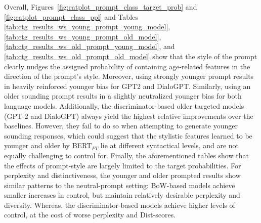 Overall, Figures~\ref{fig:catplot_prompt_class_target_prob} and \ref{fig:catplot_prompt_class_ppl} and Tables \ref{tab:ctg_results_ws_young_prompt_young_model}, \ref{tab:ctg_results_ws_young_prompt_old_model}, \ref{tab:ctg_results_ws_old_prompt_young_model}, and \ref{tab:ctg_results_ws_old_prompt_old_model} show that the style of the prompt clearly nudges the assigned probability of containing age-related features in the direction of the prompt's style. Moreover, using strongly younger prompt results in heavily reinforced younger bias for GPT2 and DialoGPT. Similarly, using an older sounding prompt results in a slightly neutralized younger bias for both language models. Additionally, the discriminator-based older targeted models (GPT-2 and DialoGPT) always yield the highest relative improvements over the baselines. However, they fail to do so when attempting to generate younger sounding responses, which could suggest that the stylistic features learned to be younger and older by BERT$_{FT}$ lie at different syntactical levels, and are not equally challenging to control for. Finally, the aforementioned tables show that the effects of prompt-style are largely limited to the target probabilities. For perplexity and distinctiveness, the younger and older prompted results show similar patterns to the neutral-prompt setting: BoW-based models achieve smaller increases in control, but maintain relatively desirable perplexity and diversity. Whereas, the discriminator-based models achieve higher levels of control, at the cost of worse perplexity and Dist-scores.


